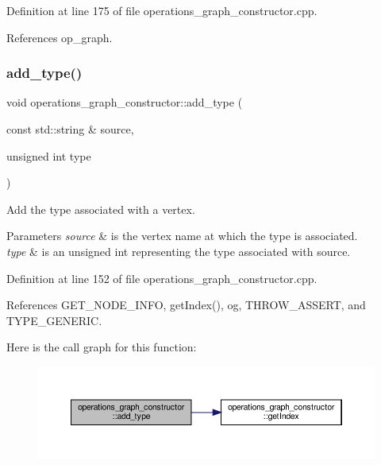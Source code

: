 Definition at line 175 of file operations\+\_\+graph\+\_\+constructor.\+cpp.



References op\+\_\+graph.

\mbox{\label{classoperations__graph__constructor_af785ad7c0d28fe5427a55d9cebafafec}} 
\subsubsection{\texorpdfstring{add\+\_\+type()}{add\_type()}}
{\footnotesize\ttfamily void operations\+\_\+graph\+\_\+constructor\+::add\+\_\+type (\begin{DoxyParamCaption}\item[{const std\+::string \&}]{source,  }\item[{unsigned int}]{type }\end{DoxyParamCaption})}



Add the type associated with a vertex. 


\begin{DoxyParams}{Parameters}
{\em source} & is the vertex name at which the type is associated. \\
\hline
{\em type} & is an unsigned int representing the type associated with source. \\
\hline
\end{DoxyParams}


Definition at line 152 of file operations\+\_\+graph\+\_\+constructor.\+cpp.



References G\+E\+T\+\_\+\+N\+O\+D\+E\+\_\+\+I\+N\+FO, get\+Index(), og, T\+H\+R\+O\+W\+\_\+\+A\+S\+S\+E\+RT, and T\+Y\+P\+E\+\_\+\+G\+E\+N\+E\+R\+IC.

Here is the call graph for this function\+:
\nopagebreak
\begin{figure}[H]
\begin{center}
\leavevmode
\includegraphics[width=350pt]{d7/d2f/classoperations__graph__constructor_af785ad7c0d28fe5427a55d9cebafafec_cgraph}
\end{center}
\end{figure}
\mbox{\label{classoperations__graph__constructor_a41852d0ad4ef4294f4bef6a2cc72b872}} 
